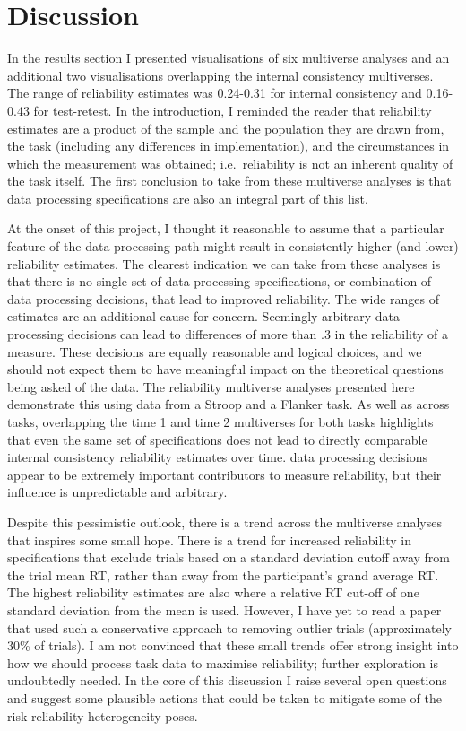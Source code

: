 \documentclass[
  english,
  man,floatsintext]{apa6}
\begin{document}
\hypertarget{discussion}{%
\section{Discussion}\label{discussion}}

In the results section I presented visualisations of six multiverse analyses and an additional two visualisations overlapping the internal consistency multiverses. The range of reliability estimates was 0.24-0.31 for internal consistency and 0.16-0.43 for test-retest. In the introduction, I reminded the reader that reliability estimates are a product of the sample and the population they are drawn from, the task (including any differences in implementation), and the circumstances in which the measurement was obtained; i.e.~reliability is not an inherent quality of the task itself. The first conclusion to take from these multiverse analyses is that data processing specifications are also an integral part of this list.

At the onset of this project, I thought it reasonable to assume that a particular feature of the data processing path might result in consistently higher (and lower) reliability estimates. The clearest indication we can take from these analyses is that there is no single set of data processing specifications, or combination of data processing decisions, that lead to improved reliability. The wide ranges of estimates are an additional cause for concern. Seemingly arbitrary data processing decisions can lead to differences of more than .3 in the reliability of a measure. These decisions are equally reasonable and logical choices, and we should not expect them to have meaningful impact on the theoretical questions being asked of the data. The reliability multiverse analyses presented here demonstrate this using data from a Stroop and a Flanker task. As well as across tasks, overlapping the time 1 and time 2 multiverses for both tasks highlights that even the same set of specifications does not lead to directly comparable internal consistency reliability estimates over time. data processing decisions appear to be extremely important contributors to measure reliability, but their influence is unpredictable and arbitrary.

Despite this pessimistic outlook, there is a trend across the multiverse analyses that inspires some small hope. There is a trend for increased reliability in specifications that exclude trials based on a standard deviation cutoff away from the trial mean RT, rather than away from the participant's grand average RT. The highest reliability estimates are also where a relative RT cut-off of one standard deviation from the mean is used. However, I have yet to read a paper that used such a conservative approach to removing outlier trials (approximately 30\% of trials). I am not convinced that these small trends offer strong insight into how we should process task data to maximise reliability; further exploration is undoubtedly needed. In the core of this discussion I raise several open questions and suggest some plausible actions that could be taken to mitigate some of the risk reliability heterogeneity poses.
\end{document}
